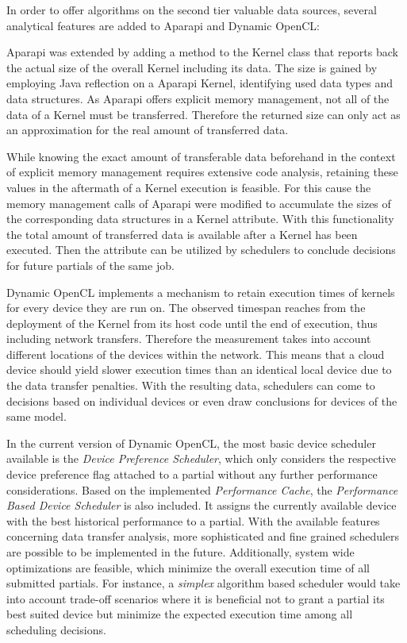 In order to offer algorithms on the second tier valuable data sources, several analytical features are added to Aparapi and Dynamic OpenCL:
\begin{description}[style=nextline]
	\item[Kernel Data Size]
	Aparapi was extended by adding a method to the Kernel class that reports back the actual size of the overall Kernel including its data. The size is gained by employing Java reflection on a Aparapi Kernel, identifying used data types and data structures. As Aparapi offers explicit memory management, not all of the data of a Kernel must be transferred. Therefore the returned size can only act as an approximation for the real amount of transferred data.
	\item[Historical Data Transfer]
	While knowing the exact amount of transferable data beforehand in the context of explicit memory management requires extensive code analysis, retaining these values in the aftermath of a Kernel execution is feasible. For this cause the memory management calls of Aparapi were modified to accumulate the sizes of the corresponding data structures in a Kernel attribute. With this functionality the total amount of transferred data is available after a Kernel has been executed. Then the attribute can be utilized by schedulers to conclude decisions for future partials of the same job.
	\item[Performance Cache]
	Dynamic OpenCL implements a mechanism to retain execution times of kernels for every device they are run on. The observed timespan reaches from the deployment of the Kernel from its host code until the end of execution, thus including network transfers. Therefore the measurement takes into account different locations of the devices within the network. This means that a cloud device should yield slower execution times than an identical local device due to the data transfer penalties. With the resulting data, schedulers can come to decisions based on individual devices or even draw conclusions for devices of the same model.
\end{description}

In the current version of Dynamic OpenCL, the most basic device scheduler available is the \textit{Device Preference Scheduler}, which only considers the respective device preference flag attached to a partial without any further performance considerations.
Based on the implemented \textit{Performance Cache}, the \textit{Performance Based Device Scheduler} is also included. It assigns the currently available device with the best historical performance to a partial. With the available features concerning data transfer analysis, more sophisticated and fine grained schedulers are possible to be implemented in the future. Additionally, system wide optimizations are feasible, which minimize the overall execution time of all submitted partials. For instance, a \textit{simplex} algorithm based scheduler would take into account trade-off scenarios where it is beneficial not to grant a partial its best suited device but minimize the expected execution time among all scheduling decisions.

